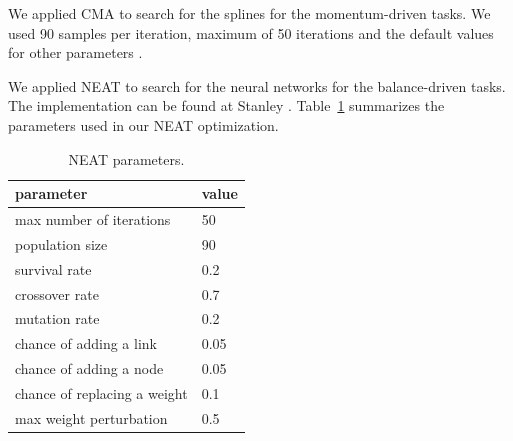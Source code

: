 We applied CMA to search for the splines for the momentum-driven tasks. We used 90 samples per iteration, maximum of 50 iterations and the default values for other parameters \cite{Hensen:2006}.

We applied NEAT to search for the neural networks for the balance-driven tasks. The implementation can be found at Stanley \cite{Stanley:2002}. Table~\ref{table:NEATParameters} summarizes the parameters used in our NEAT optimization.

\begin{table}[ht]
\vspace{-0.1in}
\centering
\caption{NEAT parameters. }
\begin{tabular}{|l|l|}
\hline
parameter & value \\
\hline
max number of iterations & 50\\
population size & 90 \\
survival rate & 0.2\\
crossover rate & 0.7 \\
mutation rate & 0.2\\
chance of adding a link & 0.05\\
chance of adding a node	& 0.05\\
chance of replacing a weight & 0.1\\
max weight perturbation & 0.5\\
\hline
\end{tabular}
\label{table:NEATParameters}
\end{table}


